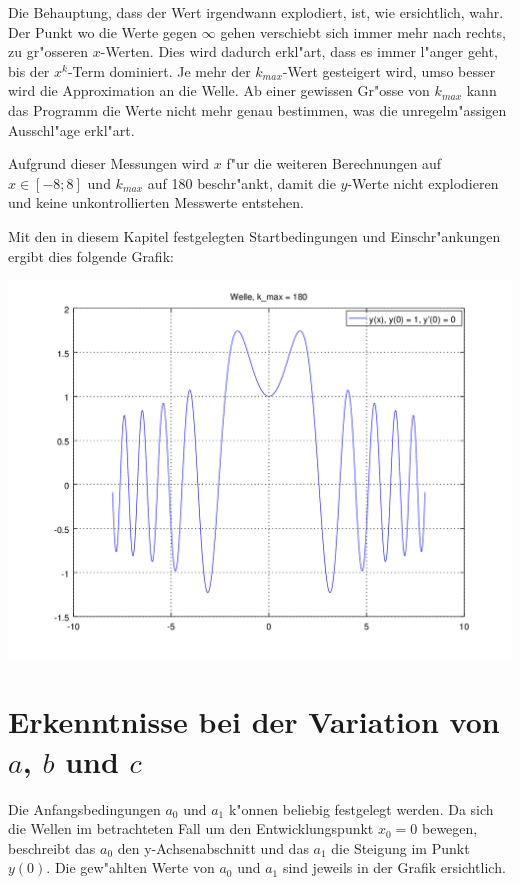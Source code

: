 Die Behauptung, dass der Wert irgendwann explodiert, ist, wie ersichtlich, 
wahr. Der Punkt wo die Werte gegen $\infty$ gehen verschiebt sich immer mehr 
nach rechts, zu gr"osseren $x$-Werten. Dies wird dadurch erkl"art, dass es 
immer l"anger geht, bis der $x^k$-Term dominiert. Je mehr der $k_{max}$-Wert 
gesteigert wird, umso besser wird die Approximation an die Welle. Ab einer 
gewissen Gr"osse von $k_{max}$ kann das Programm die Werte nicht mehr genau 
bestimmen, was die unregelm"assigen Ausschl"age erkl"art.

Aufgrund dieser Messungen wird $x$ f"ur die weiteren Berechnungen auf $x \in 
[-8;8]$ und $k_{max}$ auf 180 beschr"ankt, damit die $y$-Werte nicht 
explodieren und keine unkontrollierten Messwerte entstehen.

Mit den in diesem Kapitel festgelegten Startbedingungen und Einschr"ankungen 
ergibt dies folgende Grafik:
\begin{center}
	\includegraphics[scale=0.69]{./wellen/images/kmax/ak180-88wave.png}
\end{center}

\section{Erkenntnisse bei der Variation von \texorpdfstring{$a$}{a}, 
\texorpdfstring{$b$}{b} und \texorpdfstring{$c$}{c}}

Die Anfangsbedingungen $a_0$ und $a_1$ k"onnen beliebig festgelegt werden. Da 
sich die Wellen im betrachteten Fall um den Entwicklungspunkt $x_0=0$ bewegen, 
beschreibt das $a_0$ den y-Achsenabschnitt und das $a_1$ die Steigung im Punkt 
$y(0)$. Die gew"ahlten Werte von $a_0$ und $a_1$ sind jeweils in der Grafik 
ersichtlich.

